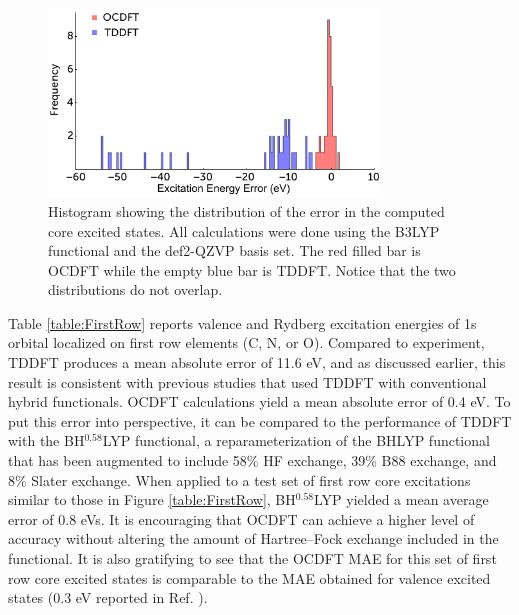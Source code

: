 \documentclass[12pt]{article}
\begin{document}
\begin{figure}[!t]
\centering
\includegraphics[width=8.8cm]{NEW_histogram2.pdf}
\caption{Histogram showing the distribution of the error in the computed core excited states. All calculations were done using the B3LYP functional and the def2-QZVP basis set. The red filled bar is OCDFT while the empty blue bar is TDDFT. Notice that the two distributions do not overlap.}
\label{figure:Hist}
\end{figure}
Table \ref{table:FirstRow} reports valence and Rydberg excitation energies of 1s orbital localized on first row elements (C, N, or O). Compared to experiment, TDDFT produces a mean absolute error of 11.6 eV, and as discussed earlier, this result is consistent with previous studies that used TDDFT with conventional hybrid functionals.\cite{besley_self-consistent-field_2009} OCDFT calculations yield a mean absolute error of 0.4 eV. To put this error into perspective, it can be compared to the performance of TDDFT with the BH$^{0.58}$LYP functional,\cite{besley_time-dependent_2009} a reparameterization of the BHLYP functional\cite{becke_new_1993,lee_development_1988-1} that has been augmented to include 58\% HF exchange, 39\% B88 exchange, and 8\% Slater exchange. When applied to a test set of first row core excitations similar to those in Figure \ref{table:FirstRow}, BH$^{0.58}$LYP yielded a mean average error of 0.8 eVs. It is encouraging that OCDFT can achieve a higher level of accuracy without altering the amount of Hartree--Fock exchange included in the functional. It is also gratifying to see that the OCDFT MAE for this set of first row core excited states is comparable to the MAE obtained for valence excited states (0.3 eV reported in Ref. ).
\end{document}
